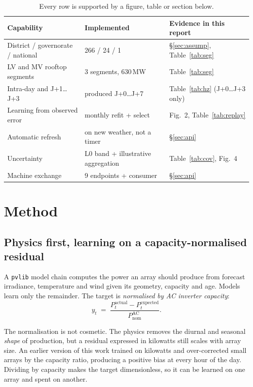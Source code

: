 \documentclass[11pt,a4paper]{article}
\newcommand{\unit}[1]{\,\textsf{\small #1}}
\begin{document}
\begin{table}[H]
\centering\small
\begin{tabular}{@{}lll@{}}
\toprule
\textbf{Capability} & \textbf{Implemented} & \textbf{Evidence in this report} \\
\midrule
District / governorate / national & 266 / 24 / 1 & \S\ref{sec:assump}, Table~\ref{tab:seg} \\
LV and MV rooftop segments & 3 segments, 630\unit{MW} & Table~\ref{tab:seg} \\
Intra-day and J+1\dots J+3 & produced J+0\dots J+7 & Table~\ref{tab:hz} (J+0\dots J+3 only) \\
Learning from observed error & monthly refit + select & Fig.~2, Table~\ref{tab:replay} \\
Automatic refresh & on new weather, not a timer & \S\ref{sec:api} \\
Uncertainty & L0 band + illustrative aggregation & Table~\ref{tab:cov}, Fig.~4 \\
Machine exchange & 9 endpoints + consumer & \S\ref{sec:api} \\
\bottomrule
\end{tabular}
\caption{Every row is supported by a figure, table or section below.}
\end{table}

\section{Method}

\subsection{Physics first, learning on a capacity-normalised residual}

A \texttt{pvlib} model chain computes the power an array should produce from
forecast irradiance, temperature and wind given its geometry, capacity and age.
Models learn only the remainder. The target is \emph{normalised by AC inverter
capacity}:
\[
y_t \;=\; \frac{P^{\text{actual}}_t - P^{\text{expected}}_t}{P^{\text{AC}}_{\text{nom}}} .
\]

The normalisation is not cosmetic. The physics removes the diurnal and seasonal
\emph{shape} of production, but a residual expressed in kilowatts still scales
with array size. An earlier version of this work trained on kilowatts and
over-corrected small arrays by the capacity ratio, producing a positive bias at
every hour of the day. Dividing by capacity makes the target dimensionless, so it
can be learned on one array and spent on another.
\end{document}
